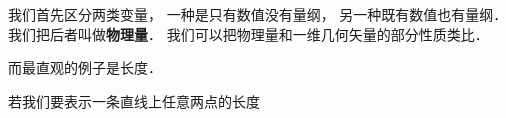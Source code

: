 

我们首先区分两类变量， 一种是只有数值没有量纲， 另一种既有数值也有量纲． 我们把后者叫做\textbf{物理量}． 我们可以把物理量和一维几何矢量的部分性质类比．

而最直观的例子是长度．

若我们要表示一条直线上任意两点的长度

